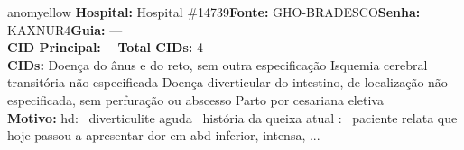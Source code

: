 \documentclass[a4paper,10pt]{article}
\begin{document}
\begin{anomalycard}[Interna\c{c}\~{a}o \#121139 | Pac. \#100390 | MODERADO (z=2.02) | LOS: 11d | 12/03/2026\,$\to$\,—]{anomyellow}
\textbf{Hospital:} Hospital \#14739\quad \textbf{Fonte:} GHO-BRADESCO\quad \textbf{Senha:} KAXNUR4\quad \textbf{Guia:} ---\\

\textbf{CID Principal:} {\small ---}\quad\textbf{Total CIDs:} 4\\

\textbf{CIDs:} {\scriptsize Doença do ânus e do reto, sem outra especificação \textbar{} Isquemia cerebral transitória não especificada \textbar{} Doença diverticular do intestino, de localização não especificada, sem perfuração ou abscesso \textbar{} Parto por cesariana eletiva}\\

\textbf{Motivo:} {\scriptsize hd:  diverticulite aguda  história da queixa atual :  paciente relata que hoje passou a apresentar dor em abd inferior, intensa, ...}\\




\end{anomalycard}
\end{document}
